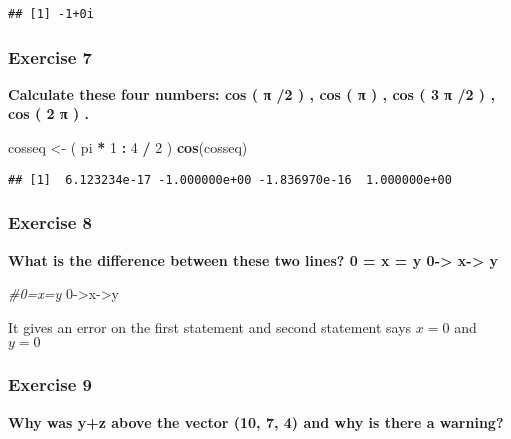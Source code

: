 \documentclass[
]{article}
\newenvironment{Shaded}{\begin{snugshade}}{\end{snugshade}}
\newcommand{\CommentTok}[1]{\textcolor[rgb]{0.56,0.35,0.01}{\textit{#1}}}
\newcommand{\DecValTok}[1]{\textcolor[rgb]{0.00,0.00,0.81}{#1}}
\newcommand{\KeywordTok}[1]{\textcolor[rgb]{0.13,0.29,0.53}{\textbf{#1}}}
\newcommand{\NormalTok}[1]{#1}
\newcommand{\OperatorTok}[1]{\textcolor[rgb]{0.81,0.36,0.00}{\textbf{#1}}}
\newcommand{\StringTok}[1]{\textcolor[rgb]{0.31,0.60,0.02}{#1}}
\begin{document}
\begin{verbatim}
## [1] -1+0i
\end{verbatim}

\hypertarget{exercise-7}{%
\subsubsection{Exercise 7}\label{exercise-7}}

\textbf{Calculate these four numbers: cos ( π /2 ) , cos ( π ) , cos ( 3
π /2 ) , cos ( 2 π ) .}

\begin{Shaded}
\begin{Highlighting}[]
\NormalTok{cosseq \textless{}{-}}\StringTok{ }\NormalTok{( pi }\OperatorTok{*}\StringTok{ }\DecValTok{1} \OperatorTok{:}\StringTok{ }\DecValTok{4} \OperatorTok{/}\StringTok{ }\DecValTok{2}\NormalTok{ )}
\KeywordTok{cos}\NormalTok{(cosseq)}
\end{Highlighting}
\end{Shaded}

\begin{verbatim}
## [1]  6.123234e-17 -1.000000e+00 -1.836970e-16  1.000000e+00
\end{verbatim}

\hypertarget{exercise-8}{%
\subsubsection{Exercise 8}\label{exercise-8}}

\textbf{What is the difference between these two lines? 0 = x = y
0-\textgreater{} x-\textgreater{} y }

\begin{Shaded}
\begin{Highlighting}[]
\CommentTok{\#0=x=y}
\DecValTok{0}\NormalTok{{-}\textgreater{}x{-}\textgreater{}y}
\end{Highlighting}
\end{Shaded}

It gives an error on the first statement and second statement says
\(x = 0\) and \(y = 0\)

\hypertarget{exercise-9}{%
\subsubsection{Exercise 9}\label{exercise-9}}

\textbf{Why was y+z above the vector (10, 7, 4) and why is there a
warning?}
\end{document}
